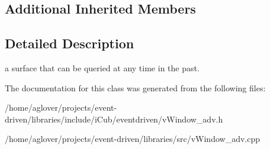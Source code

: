 \subsection*{Additional Inherited Members}


\subsection{Detailed Description}
a surface that can be queried at any time in the past. 

The documentation for this class was generated from the following files\+:\begin{DoxyCompactItemize}
\item 
/home/aglover/projects/event-\/driven/libraries/include/i\+Cub/eventdriven/v\+Window\+\_\+adv.\+h\item 
/home/aglover/projects/event-\/driven/libraries/src/v\+Window\+\_\+adv.\+cpp\end{DoxyCompactItemize}
